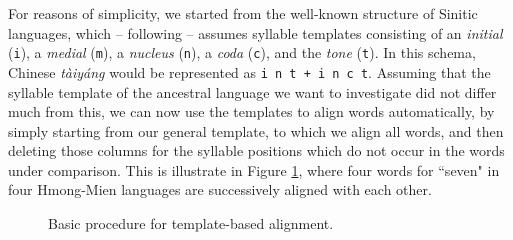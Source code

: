 \documentclass[xetex,svgnames]{scrartcl}
\begin{document}
For reasons of simplicity, we started from the well-known structure of Sinitic languages, which --
following \citet{Wang1996} --
assumes syllable templates consisting of an \emph{initial} (\texttt{i}), a \emph{medial}
(\texttt{m}), a \emph{nucleus} (\texttt{n}), a \emph{coda} (\texttt{c}), and the \emph{tone}
(\texttt{t}). In this schema, Chinese \emph{tàiyáng} {\sil [tʰ~ai~⁵¹ +  j~a~ŋ~³⁵]} would be
represented as \texttt{i~n~t + i~n~c~t}. Assuming that the syllable template of the ancestral
language we want to investigate did not differ much from this, we can now use the templates to
align words automatically, by simply starting from our general template, to which we align all
words, and then deleting those columns for the syllable positions which do not occur in the words
under comparison. This is illustrate in Figure \ref{fig:template}, where four words for ``seven" in
four Hmong-Mien languages are successively aligned with each other.

\begin{figure}[htb]
  \centering
\caption{Basic procedure for template-based alignment.}
\label{fig:template}
\end{figure}
\end{document}

